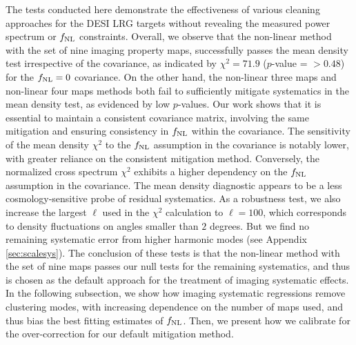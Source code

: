 The tests conducted here demonstrate the effectiveness of various cleaning approaches for the DESI LRG targets without revealing the measured power spectrum or $f_{\rm NL}$ constraints. Overall, we observe that the non-linear method with the set of nine imaging property maps, successfully passes the mean density test irrespective of the covariance, as indicated by $\chi^{2}=71.9$ ($p$-value = $>0.48$) for the $f_{\rm NL}=0$ covariance. On the other hand, the non-linear three maps and non-linear four maps methods both fail to sufficiently mitigate systematics in the mean density test, as evidenced by low $p$-values. Our work shows that it is essential to maintain a consistent covariance matrix, involving the same mitigation and ensuring consistency in $f_{\rm NL}$ within the covariance. The sensitivity of the mean density $\chi^{2}$ to the $f_{\rm NL}$ assumption in the covariance is notably lower, with greater reliance on the consistent mitigation method.  Conversely, the normalized cross spectrum $\chi^{2}$ exhibits a higher dependency on the $f_{\rm NL}$ assumption in the covariance. The mean density diagnostic appears to be a less cosmology-sensitive probe of residual systematics. As a robustness test, we also increase the largest $\ell$ used in the $\chi^{2}$ calculation to $\ell=100$, which corresponds to density fluctuations on angles smaller than $2$ degrees. But we find no remaining systematic error from higher harmonic modes (see Appendix \ref{sec:scalesys}). The conclusion of these tests is that the non-linear method with the set of nine maps passes our null tests for the remaining systematics, and thus is chosen as the default approach for the treatment of imaging systematic effects. In the following subsection, we show how imaging systematic regressions remove clustering modes, with increasing dependence on the number of maps used, and thus bias the best fitting estimates of $f_{\rm NL}$. Then, we present how we calibrate for the over-correction for our default mitigation method.

